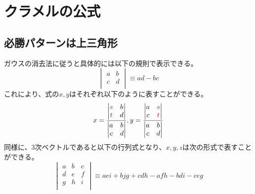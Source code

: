 \documentclass[]{ltjsarticle}%
\begin{document}
\section{クラメルの公式}
\label{"sec:linear02"}

\subsection{必勝パターンは上三角形}

ガウスの消去法に従うと具体的には以下の規則で表示できる。
\begin{equation}
  \label{eq:eq0202}
  \begin{vmatrix}
    a & b \\
    c & d \\
  \end{vmatrix}
  \equiv%
  ad - bc
\end{equation}
これにより、式の\(x,y\)はそれぞれ以下のように表すことができる。
\begin{equation}
  \label{eq:eq0203}
  x =
  \frac{
    \begin{vmatrix}
      \textcolor{red}{s} & b \\
      \textcolor{red}{t} & d \\
    \end{vmatrix}
  }
  {
    \begin{vmatrix}
      a & b \\
      c & d \\
    \end{vmatrix}
  },
  y =
  \frac{
    \begin{vmatrix}
      a & \textcolor{red}{s} \\
      c & \textcolor{red}{t} \\
    \end{vmatrix}
  }
  {
    \begin{vmatrix}
      a & b \\
      c & d \\
    \end{vmatrix}
  }
\end{equation}
同様に、3次ベクトルであると以下の行列式となり、\(x,y,z\)は次の形式で表すことができる。
\begin{equation}
  \label{eq:eq0204}
  \begin{vmatrix}
    a & b & c \\
    d & e & f \\
    g & h & i \\
  \end{vmatrix}
  \equiv%
  aei + bjg + cdh - afh - bdi - ceg
\end{equation}
\end{document}
